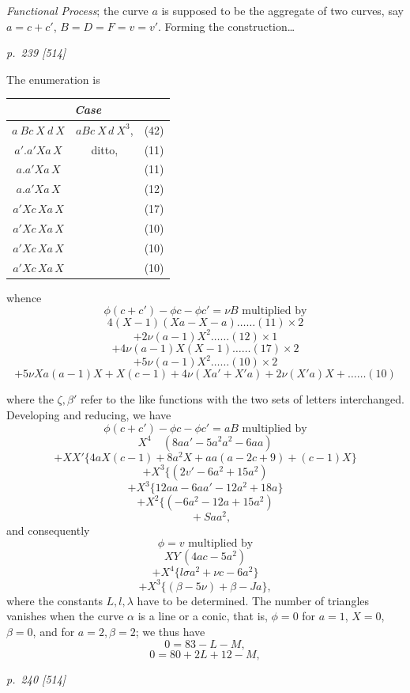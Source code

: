 \documentclass[11pt,a4paper]{book}
\begin{document}
\textit{Functional Process}; the curve $a$ is supposed to be the aggregate of two curves, say
$a=c+c'$, $B=D=F=v=v'$.  Forming the construction\ldots

\clearpage

\bigskip
\textit{p.~239 [514]}
\smallskip

The enumeration is
\begin{center}
\begin{tabular}{|c|c|c|}
\hline
\multicolumn{3}{|c|}{\textit{Case}} \\
\hline
$a\ Bc\ X\ d\ X$ & $aBc\ X\,d\ X^3$, & (42) \\
\hline
$a' . a' Xa\,X$ & ditto, & (11) \\
$a . a' Xa\,X$ & & (11) \\
$a . a' Xa\,X$ & & (12) \\
$a' Xc\,Xa\,X$ & & (17) \\
$a' Xc\,Xa\,X$ & & (10) \\
$a' Xc\,Xa\,X$ & & (10) \\
$a' Xc\,Xa\,X$ & & (10) \\
\hline
\end{tabular}
\end{center}

whence
\[
\phi(c+c')-\phi c-\phi c'=\nu B \text{ multiplied by}
\]
\[
4(X-1)(Xa-X-a)\ldots\ldots(11)\times 2
\]
\[
+2\nu(a-1)X^2\ldots\ldots(12)\times 1
\]
\[
+4\nu(a-1)X(X-1)\ldots\ldots(17)\times 2
\]
\[
+5\nu(a-1)X^2\ldots\ldots(10)\times 2
\]
\[
+5\nu Xa(a-1)X+X(c-1)+4\nu(Xa'+X'a)+2\nu(X'a)X+\ldots\ldots(10)
\]

where the $\zeta, \beta'$ refer to the like functions with the two sets of letters interchanged.
Developing and reducing, we have
\[
\phi(c+c')-\phi c-\phi c'=aB \text{ multiplied by}
\]
\[
X^4 \quad (8aa'-5a^2a^2-6aa)
\]
\[
+XX'\{4aX(c-1)+8a^2X+aa(a-2c+9)+(c-1)X\}
\]
\[
+X^3 \{(2v'-6a^2+15a^2)
\]
\[
+X^3 \{12aa-6aa'-12a^2+18a\}
\]
\[
+X^2 \{(-6a^2-12a+15a^2)
\]
\[
\quad +Saa^2,
\]
and consequently
\[
\phi=v \text{ multiplied by}
\]
\[
XY\,(4a c-5a^2)
\]
\[
+X^4\{l\sigma a^2+\nu c-6a^2\}
\]
\[
+X^3 \{(\beta-5\nu)+\beta-Ja\},
\]
where the constants $L, l, \lambda$ have to be determined.  The number of triangles vanishes
when the curve $\alpha$ is a line or a conic, that is, $\phi=0$ for $a=1$, $X=0$, $\beta=0$, and for
$a=2, \beta=2$; we thus have
\[
0=83-L-M,
\]
\[
0=80+2L+12-M,
\]

\clearpage

\bigskip
\textit{p.~240 [514]}
\smallskip
\end{document}
